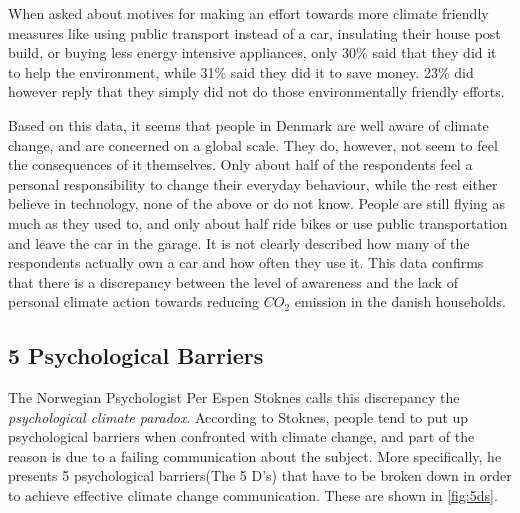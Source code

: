         When asked about motives for making an effort towards more climate friendly measures like using public transport instead of a car, insulating their house post build, or buying less energy intensive appliances, only 30\% said that they did it to help the environment, while 31\% said they did it to save money. 23\% did however reply that they simply did not do those environmentally friendly efforts\cite{concito}.
        
        Based on this data, it seems that people in Denmark are well aware of climate change, and are concerned on a global scale. They do, however, not seem to feel the consequences of it themselves. Only about half of the respondents feel a personal responsibility to change their everyday behaviour, while the rest either believe in technology, none of the above or do not know. People are still flying as much as they used to, and only about half ride bikes or use public transportation and leave the car in the garage. It is not clearly described how many of the respondents actually own a car and how often they use it. This data confirms that there is a discrepancy between the level of awareness and the lack of personal climate action towards reducing $CO_2$ emission in the danish households.
    
    \subsection{5 Psychological Barriers}\label{sec:5barriers}
        The Norwegian Psychologist Per Espen Stoknes calls this discrepancy the \textit{psychological climate paradox}\cite{storyAboutClimateChange, the5Ds}. According to Stoknes, people tend to put up psychological barriers when confronted with climate change, and part of the reason is due to a failing communication about the subject. More specifically, he presents 5 psychological barriers(The 5 D's) that have to be broken down in order to achieve effective climate change communication. These are shown in \autoref{fig:5ds}.
        
